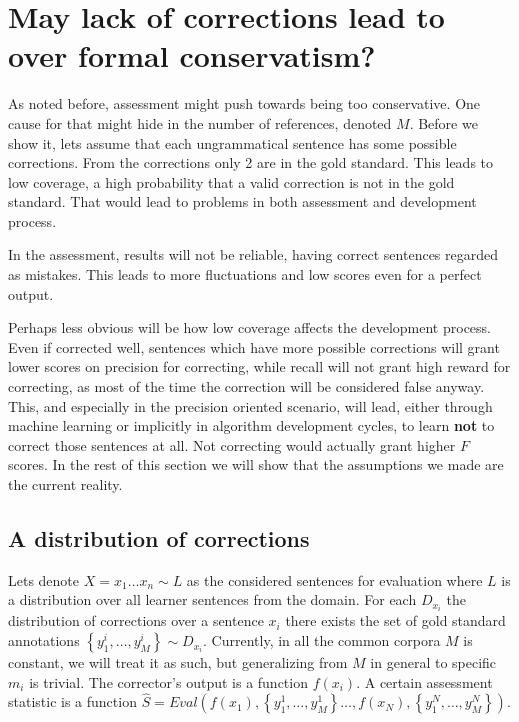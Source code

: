 \documentclass[english]{article}
\begin{document}
{\section{May lack of corrections lead to over formal conservatism?\label{sec:increase-reference}}

As noted before, assessment might push towards being too conservative. One cause for that
might hide in the number of references, denoted $M$. Before we show it, lets assume
that each ungrammatical sentence has some possible corrections. From
the corrections only 2 are in the gold standard. This leads to low coverage, a high probability that a valid correction is not in the gold standard. That would lead to
problems in both assessment and development process. 

In the assessment,
results will not be reliable, having correct sentences regarded as mistakes. This leads to more fluctuations and low scores even for a perfect output.

Perhaps less obvious will be how low coverage affects the development
process. Even if corrected well, sentences which have more possible
corrections will grant lower scores on precision for correcting, while recall will not grant high reward for correcting, as most of the time the correction will be considered false anyway. This, and especially in the precision oriented scenario, will lead, either through
machine learning or implicitly in algorithm development cycles, to learn \textbf{not} to correct
those sentences at all. Not correcting would actually grant higher $F$ scores. In the rest of this section we will show that the assumptions we made are the current reality. 

\subsection{A distribution of corrections}

Lets denote $X=x_{1}\ldots x_n\sim L$ as the considered
sentences for evaluation where $L$ is a distribution over all learner sentences from the domain. 
For each $D_{x_i}$ the distribution of corrections over a sentence $x_i$ there exists the set of gold standard annotations $\left\{ y_{1}^{i},\ldots,y_{M}^{i}\right\} \sim D_{x_i}$. Currently, in all the common corpora $M$ is constant, we will treat it as such, but generalizing from $M$ in general to specific $m_i$ is trivial. The corrector's output is a function $f\left(x_{i}\right)$. A certain assessment statistic is a function $\hat{S}=Eval\left(f\left(x_{1}\right),\left\{ y_{1}^{1},\ldots,y_{M}^{1}\right\} \ldots,f\left(x_{N}\right),\left\{ y_{1}^{N},\ldots,y_{M}^{N}\right\} \right)$.

}
\end{document}
